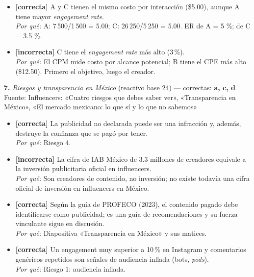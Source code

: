 \documentclass[10pt,letterpaper]{article}
\begin{document}
{\begin{itemize}[leftmargin=1.2em,itemsep=0pt,topsep=1pt,parsep=0pt]
\item[\textbf{c)}] {\footnotesize \textbf{[correcta]} A y C tienen el mismo costo por interacción (\$5.00), aunque A tiene mayor \textit{engagement rate}.\\ \textit{Por qué:} A: 7\,500/1\,500 = 5.00; C: 26\,250/5\,250 = 5.00. ER de A = 5 \%; de C = 3.5 \%.}
\item[\textbf{d)}] {\footnotesize \textbf{[incorrecta]} C tiene el \textit{engagement rate} más alto (3\,\%).\\ \textit{Por qué:} El CPM mide costo por alcance potencial; B tiene el CPE más alto (\$12.50). Primero el objetivo, luego el creador.}
\end{itemize}
\vspace{3pt}\noindent\textbf{7.} \textit{Riesgos y transparencia en México} (reactivo base 24) — correctas: \textbf{a, c, d}\\[-1pt]
{\scriptsize Fuente: Influencers: «Cuatro riesgos que debes saber ver», «Transparencia en México», «El mercado mexicano: lo que sí y lo que no sabemos»}
\begin{itemize}[leftmargin=1.2em,itemsep=0pt,topsep=1pt,parsep=0pt]
\item[\textbf{a)}] {\footnotesize \textbf{[correcta]} La publicidad no declarada puede ser una infracción y, además, destruye la confianza que se pagó por tener.\\ \textit{Por qué:} Riesgo 4.}
\item[\textbf{b)}] {\footnotesize \textbf{[incorrecta]} La cifra de IAB México de 3.3 millones de creadores equivale a la inversión publicitaria oficial en influencers.\\ \textit{Por qué:} Son creadores de contenido, no inversión; no existe todavía una cifra oficial de inversión en influencers en México.}
\item[\textbf{c)}] {\footnotesize \textbf{[correcta]} Según la guía de PROFECO (2023), el contenido pagado debe identificarse como publicidad; es una guía de recomendaciones y su fuerza vinculante sigue en discusión.\\ \textit{Por qué:} Diapositiva «Transparencia en México» y sus matices.}
\item[\textbf{d)}] {\footnotesize \textbf{[correcta]} Un engagement muy superior a 10\,\% en Instagram y comentarios genéricos repetidos son señales de audiencia inflada (bots, \textit{pods}).\\ \textit{Por qué:} Riesgo 1: audiencia inflada.}
\end{itemize}
}
\end{document}
